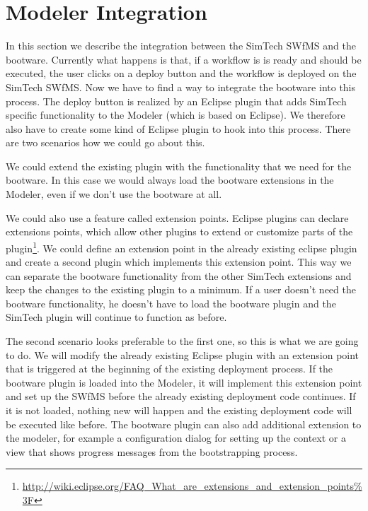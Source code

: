 \section{Modeler Integration}
\label{implementation:modeler_integration}

In this section we describe the integration between the SimTech SWfMS and the bootware.
Currently what happens is that, if a workflow is is ready and should be executed, the user clicks on a deploy button and the workflow is deployed on the SimTech SWfMS.
Now we have to find a way to integrate the bootware into this process.
The deploy button is realized by an Eclipse plugin that adds SimTech specific functionality to the Modeler (which is based on Eclipse).
We therefore also have to create some kind of Eclipse plugin to hook into this process.
There are two scenarios how we could go about this.

We could extend the existing plugin with the functionality that we need for the bootware.
In this case we would always load the bootware extensions in the Modeler, even if we don't use the bootware at all.

We could also use a feature called extension points.
Eclipse plugins can declare extensions points, which allow other plugins to extend or customize parts of the plugin\footnote{\url{http://wiki.eclipse.org/FAQ_What_are_extensions_and_extension_points\%3F}}.
We could define an extension point in the already existing eclipse plugin and create a second plugin which implements this extension point.
This way we can separate the bootware functionality from the other SimTech extensions and keep the changes to the existing plugin to a minimum.
If a user doesn't need the bootware functionality, he doesn't have to load the bootware plugin and the SimTech plugin will continue to function as before.

The second scenario looks preferable to the first one, so this is what we are going to do.
We will modify the already existing Eclipse plugin with an extension point that is triggered at the beginning of the existing deployment process.
If the bootware plugin is loaded into the Modeler, it will implement this extension point and set up the SWfMS before the already existing deployment code continues.
If it is not loaded, nothing new will happen and the existing deployment code will be executed like before.
The bootware plugin can also add additional extension to the modeler, for example a configuration dialog for setting up the context or a view that shows progress messages from the bootstrapping process.
